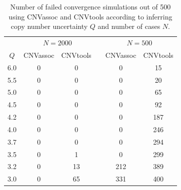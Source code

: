 \documentclass[11pt]{article}
\begin{document}
\begin{table}
\begin{center}
\begin{tabular}{c c c c c c}
\hline
     &  \multicolumn{2}{c}{$N=2000$}  & & \multicolumn{2}{c}{$N=500$} \\
\cline{2-3} 
\cline{5-6}
$Q$    &      CNVassoc    &      CNVtools    &          &      CNVassoc    &      CNVtools  \\ 
\hline
6.0    &      0    &      0    &          &      0    &      15  \\ 
5.5    &      0    &      0    &          &      0    &      20  \\ 
5.0    &      0    &      0    &          &      0    &      65  \\ 
4.5    &      0    &      0    &          &      0    &      92  \\ 
4.2    &      0    &      0    &          &      0    &      187  \\ 
4.0    &      0    &      0    &          &      0    &      246  \\ 
3.7    &      0    &      0    &          &      0    &      294  \\ 
3.5    &      0    &      1    &          &      0    &      299  \\ 
3.2    &      0    &      13    &          &      212    &      389  \\ 
3.0    &      0    &      65    &          &      331    &      400 \\ 
\hline
\end{tabular}
\caption{\small Number of failed convergence simulations out of 500 using CNVassoc and CNVtools according to inferring
copy number uncertainty $Q$ and number of cases $N$.}\label{table-time}
\end{center}
\end{table}
\end{document}

